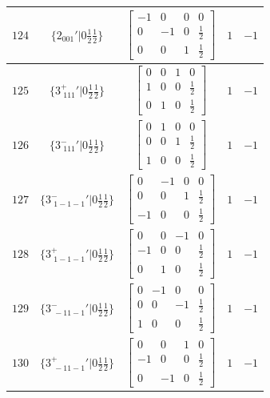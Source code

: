 \documentclass[fleqn,8pt]{jsarticle}
\begin{document}
\begin{longtable}{ccccc}
$ 124 $ & $ \{2{}_{001}{}'|0 \frac{1}{2} \frac{1}{2}\} $ & $ \begin{bmatrix} -1 & 0 & 0 & 0 \\ 0 & -1 & 0 & \frac{1}{2} \\ 0 & 0 & 1 & \frac{1}{2} \end{bmatrix} $ & $ 1 $ & $ -1 $ \\ \hline
$ 125 $ & $ \{3^{+}_{\,\,111}{}'|0 \frac{1}{2} \frac{1}{2}\} $ & $ \begin{bmatrix} 0 & 0 & 1 & 0 \\ 1 & 0 & 0 & \frac{1}{2} \\ 0 & 1 & 0 & \frac{1}{2} \end{bmatrix} $ & $ 1 $ & $ -1 $ \\ \hline
$ 126 $ & $ \{3^{-}_{\,\,111}{}'|0 \frac{1}{2} \frac{1}{2}\} $ & $ \begin{bmatrix} 0 & 1 & 0 & 0 \\ 0 & 0 & 1 & \frac{1}{2} \\ 1 & 0 & 0 & \frac{1}{2} \end{bmatrix} $ & $ 1 $ & $ -1 $ \\ \hline
$ 127 $ & $ \{3^{-}_{\,\,1-1-1}{}'|0 \frac{1}{2} \frac{1}{2}\} $ & $ \begin{bmatrix} 0 & -1 & 0 & 0 \\ 0 & 0 & 1 & \frac{1}{2} \\ -1 & 0 & 0 & \frac{1}{2} \end{bmatrix} $ & $ 1 $ & $ -1 $ \\ \hline
$ 128 $ & $ \{3^{+}_{\,\,1-1-1}{}'|0 \frac{1}{2} \frac{1}{2}\} $ & $ \begin{bmatrix} 0 & 0 & -1 & 0 \\ -1 & 0 & 0 & \frac{1}{2} \\ 0 & 1 & 0 & \frac{1}{2} \end{bmatrix} $ & $ 1 $ & $ -1 $ \\ \hline
$ 129 $ & $ \{3^{-}_{\,\,-11-1}{}'|0 \frac{1}{2} \frac{1}{2}\} $ & $ \begin{bmatrix} 0 & -1 & 0 & 0 \\ 0 & 0 & -1 & \frac{1}{2} \\ 1 & 0 & 0 & \frac{1}{2} \end{bmatrix} $ & $ 1 $ & $ -1 $ \\ \hline
$ 130 $ & $ \{3^{+}_{\,\,-11-1}{}'|0 \frac{1}{2} \frac{1}{2}\} $ & $ \begin{bmatrix} 0 & 0 & 1 & 0 \\ -1 & 0 & 0 & \frac{1}{2} \\ 0 & -1 & 0 & \frac{1}{2} \end{bmatrix} $ & $ 1 $ & $ -1 $ \\ \hline

\end{longtable}
\end{document}
